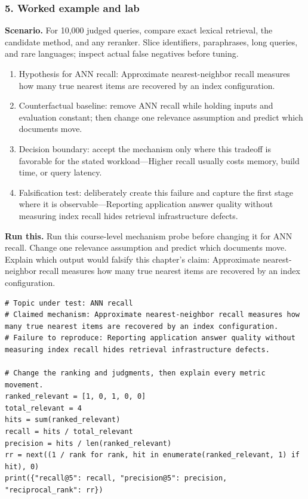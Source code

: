 \subsubsection*{5. Worked example and lab}
\textbf{Scenario.} For 10,000 judged queries, compare exact lexical retrieval, the candidate method, and any reranker. Slice identifiers, paraphrases, long queries, and rare languages; inspect actual false negatives before tuning.
\begin{enumerate}
\item Hypothesis for ANN recall: Approximate nearest-neighbor recall measures how many true nearest items are recovered by an index configuration.
\item Counterfactual baseline: remove ANN recall while holding inputs and evaluation constant; then change one relevance assumption and predict which documents move.
\item Decision boundary: accept the mechanism only where this tradeoff is favorable for the stated workload—Higher recall usually costs memory, build time, or query latency.
\item Falsification test: deliberately create this failure and capture the first stage where it is observable—Reporting application answer quality without measuring index recall hides retrieval infrastructure defects.
\end{enumerate}
\textbf{Run this.} Run this course-level mechanism probe before changing it for ANN recall. Change one relevance assumption and predict which documents move. Explain which output would falsify this chapter's claim: Approximate nearest-neighbor recall measures how many true nearest items are recovered by an index configuration.
\begin{Verbatim}[fontsize=\scriptsize]
# Topic under test: ANN recall
# Claimed mechanism: Approximate nearest-neighbor recall measures how many true nearest items are recovered by an index configuration.
# Failure to reproduce: Reporting application answer quality without measuring index recall hides retrieval infrastructure defects.

# Change the ranking and judgments, then explain every metric movement.
ranked_relevant = [1, 0, 1, 0, 0]
total_relevant = 4
hits = sum(ranked_relevant)
recall = hits / total_relevant
precision = hits / len(ranked_relevant)
rr = next((1 / rank for rank, hit in enumerate(ranked_relevant, 1) if hit), 0)
print({"recall@5": recall, "precision@5": precision, "reciprocal_rank": rr})
\end{Verbatim}
